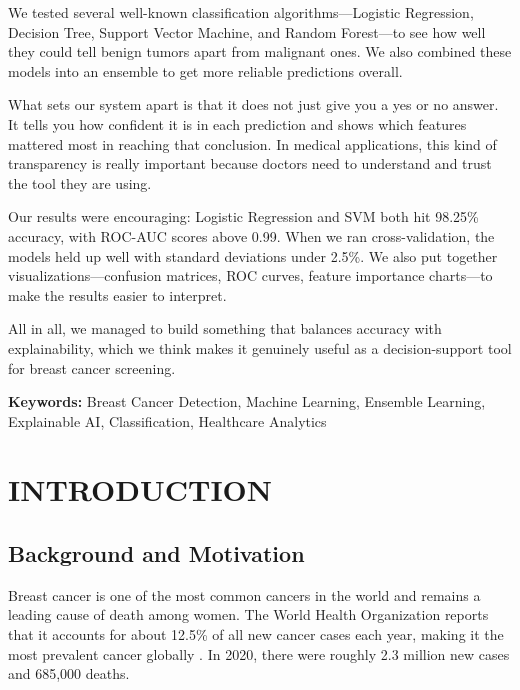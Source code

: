 \documentclass[12pt]{article}
\begin{document}
\noindent We tested several well-known classification algorithms---Logistic Regression, Decision Tree, Support Vector Machine, and Random Forest---to see how well they could tell benign tumors apart from malignant ones. We also combined these models into an ensemble to get more reliable predictions overall.

\noindent What sets our system apart is that it does not just give you a yes or no answer. It tells you how confident it is in each prediction and shows which features mattered most in reaching that conclusion. In medical applications, this kind of transparency is really important because doctors need to understand and trust the tool they are using.

\noindent Our results were encouraging: Logistic Regression and SVM both hit 98.25\% accuracy, with ROC-AUC scores above 0.99. When we ran cross-validation, the models held up well with standard deviations under 2.5\%. We also put together visualizations---confusion matrices, ROC curves, feature importance charts---to make the results easier to interpret.

\noindent All in all, we managed to build something that balances accuracy with explainability, which we think makes it genuinely useful as a decision-support tool for breast cancer screening.

\vspace{0.5cm}
\noindent \textbf{Keywords:} Breast Cancer Detection, Machine Learning, Ensemble Learning, Explainable AI, Classification, Healthcare Analytics

\newpage
\tableofcontents

\newpage
\listoffigures

\newpage
\listoftables

\newpage
{}
\section{INTRODUCTION}

\subsection{Background and Motivation}

Breast cancer is one of the most common cancers in the world and remains a leading cause of death among women. The World Health Organization reports that it accounts for about 12.5\% of all new cancer cases each year, making it the most prevalent cancer globally \cite{who2023}. In 2020, there were roughly 2.3 million new cases and 685,000 deaths.
\end{document}
